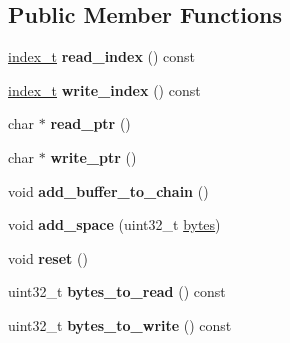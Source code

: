 \subsection*{Public Member Functions}
\begin{DoxyCompactItemize}
\item 
\mbox{\label{classaacio_1_1message__buffer_a4ed12e66f6c398914f50873ddc6c7a54}} 
\mbox{\hyperlink{structindex__t}{index\+\_\+t}} {\bfseries read\+\_\+index} () const
\item 
\mbox{\label{classaacio_1_1message__buffer_a884e0798c02aa6f2f6dbecf440de7d6e}} 
\mbox{\hyperlink{structindex__t}{index\+\_\+t}} {\bfseries write\+\_\+index} () const
\item 
\mbox{\label{classaacio_1_1message__buffer_a1a76cf35f836c452f41a684a39384458}} 
char $\ast$ {\bfseries read\+\_\+ptr} ()
\item 
\mbox{\label{classaacio_1_1message__buffer_a6ed81b9b212b14ea3980b5bc00bb803d}} 
char $\ast$ {\bfseries write\+\_\+ptr} ()
\item 
\mbox{\label{classaacio_1_1message__buffer_ab834f0b31fca43f2ac436d2ad5040f95}} 
void {\bfseries add\+\_\+buffer\+\_\+to\+\_\+chain} ()
\item 
\mbox{\label{classaacio_1_1message__buffer_a777bae1cb137a6abf2cfc0cd11b15bdc}} 
void {\bfseries add\+\_\+space} (uint32\+\_\+t \mbox{\hyperlink{classstd_1_1vector}{bytes}})
\item 
\mbox{\label{classaacio_1_1message__buffer_a8431714752e6773887be074a130b1eb0}} 
void {\bfseries reset} ()
\item 
\mbox{\label{classaacio_1_1message__buffer_a7d3f56a7afae95fdf6e4d1bad2a776f7}} 
uint32\+\_\+t {\bfseries bytes\+\_\+to\+\_\+read} () const
\item 
\mbox{\label{classaacio_1_1message__buffer_a470aa63d3ec989351ea9e089c6f59276}} 
uint32\+\_\+t {\bfseries bytes\+\_\+to\+\_\+write} () const

\end{DoxyCompactItemize}
